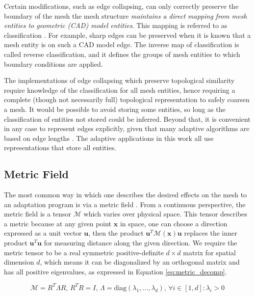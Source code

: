 Certain modifications, such as edge collapsing, can only correctly
preserve the boundary of the mesh the mesh structure \emph{maintains
a direct mapping from mesh entities to geometric (CAD) model
entities}.
This mapping is referred to as classification \cite{schroeder1990combined}.
For example, sharp edges
can be preserved when it is known that a mesh entity is
on such a CAD model edge.
The inverse map of classification is called reverse
classification, and it defines the groups of mesh entities
to which boundary conditions are applied.

The implementations of edge collapsing which preserve
topological similarity require knowledge
of the classification for all mesh entities,
hence requiring a complete (though not necessarily full)
topological representation \cite{seol2006efficient}
to safely coarsen a mesh.
It would be possible to avoid storing some entities, so long
as the classification of entities not stored could be inferred.
Beyond that, it is convenient in any case to represent
edges explicitly, given that many adaptive algorithms
are based on edge lengths \cite{biswas1998tetrahedral}.
The adaptive applications in this work all use representations
that store all entities.

\subsection{Metric Field}
\label{sec:def_metric}

The most common way in which one describes the desired effects on
the mesh to an adaptation program is via a metric field
\cite{loseille2015parallel,compere2010mesh,li20053d}.
From a continuous perspective, the metric field is a tensor
$\mathcal{M}$ which varies over physical space.
This tensor describes a metric because at any given point
$\mathbf{x}$ in space, one can choose a direction expressed
as a unit vector $\mathbf{u}$, then the product
$\mathbf{u}^T\mathcal{M}(\mathbf{x})\mathbf{u}$ replaces the inner
product $\mathbf{u}^T\mathbf{u}$ for measuring distance along
the given direction.
We require the metric tensor to be a real symmetric positive-definite
$d\times d$ matrix for spatial dimension $d$, which means it
can be diagonalized by an orthogonal matrix and has all
positive eigenvalues, as expressed in Equation \ref{eq:metric_decomp}.

\begin{equation} \label{eq:metric_decomp}
\mathcal{M} = R^T\Lambda R,\, R^T R = I,\, \Lambda = \text{diag}(\lambda_1,\dots,\lambda_d),\,
\forall i\in [1,d]: \lambda_i > 0
\end{equation}

